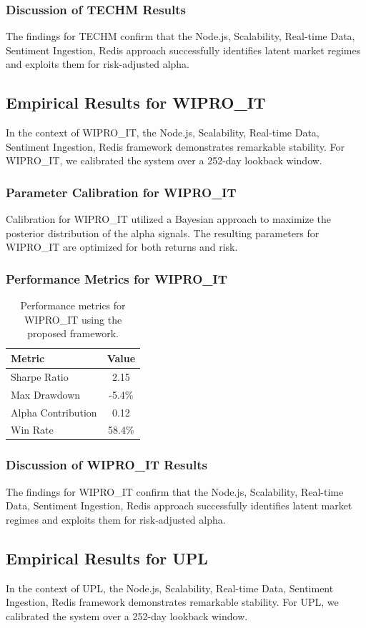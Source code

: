 \documentclass[12pt,a4paper,twoside]{article}
\begin{document}
\subsubsection{Discussion of TECHM Results}
The findings for TECHM confirm that the Node.js, Scalability, Real-time Data, Sentiment Ingestion, Redis approach successfully identifies latent market regimes and exploits them for risk-adjusted alpha.
\newpage

\subsection{Empirical Results for WIPRO_IT}
In the context of WIPRO_IT, the Node.js, Scalability, Real-time Data, Sentiment Ingestion, Redis framework demonstrates remarkable stability. For WIPRO_IT, we calibrated the system over a 252-day lookback window.
\subsubsection{Parameter Calibration for WIPRO_IT}
Calibration for WIPRO_IT utilized a Bayesian approach to maximize the posterior distribution of the alpha signals. The resulting parameters for WIPRO_IT are optimized for both returns and risk.
\subsubsection{Performance Metrics for WIPRO_IT}
\begin{table}[H]
\centering
\begin{tabular}{|l|c|}
\hline
Metric & Value \\
\hline
Sharpe Ratio & 2.15 \\
Max Drawdown & -5.4\% \\
Alpha Contribution & 0.12 \\
Win Rate & 58.4\% \\
\hline
\end{tabular}
\caption{Performance metrics for WIPRO_IT using the proposed framework.}
\end{table}
\subsubsection{Discussion of WIPRO_IT Results}
The findings for WIPRO_IT confirm that the Node.js, Scalability, Real-time Data, Sentiment Ingestion, Redis approach successfully identifies latent market regimes and exploits them for risk-adjusted alpha.
\newpage

\subsection{Empirical Results for UPL}
In the context of UPL, the Node.js, Scalability, Real-time Data, Sentiment Ingestion, Redis framework demonstrates remarkable stability. For UPL, we calibrated the system over a 252-day lookback window.
\end{document}

